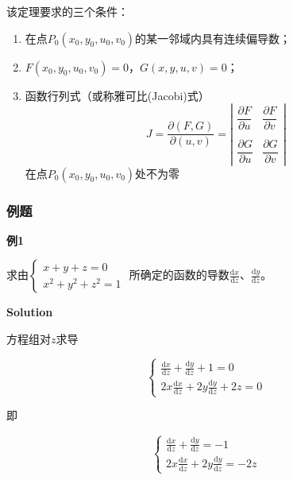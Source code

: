 \documentclass[12pt, a4paper]{article}
\numberwithin{equation}{section}
\newcommand{\rmd}{\mathrm{d}}
\newcommand{\deriv}[2]{\frac{\rmd #1}{\rmd #2}}
\begin{document}
    该定理要求的三个条件：

    \begin{enumerate}
        \item 在点\(P_0\left(x_0,y_0,u_0,v_0\right)\)的某一邻域内具有连续偏导数；
        \item \(F\left(x_0,y_0,u_0,v_0\right)=0\)，\(G\left(x,y,u,v\right)=0\)；
        \item 函数行列式（或称雅可比(Jacobi)式）
            $$
                J=\frac{\partial(F, G)}{\partial(u, v)}=\left|\begin{array}{ll}
                \dfrac{\partial F}{\partial u} & \dfrac{\partial F}{\partial v} \\ \\
                \dfrac{\partial G}{\partial u} & \dfrac{\partial G}{\partial v}
                \end{array}\right|
            $$
            在点\(P_0\left(x_0,y_0,u_0,v_0\right)\)处不为零
    \end{enumerate}

\subsubsection{例题}

    \textbf{例1}
    \vspace{1em}

    求由$\left\{\begin{array}{l}x+y+z=0 \\ x^2+y^2+z^2=1\end{array}\right.$
    所确定的函数的导数\(\deriv{x}{z}\)、\(\deriv{y}{z}\)。
    \vspace{1em}

    \textbf{Solution}
    \vspace{1em}

    方程组对\(z\)求导

    $$
        \left\{\begin{array}{c}
            \deriv{x}{z}+\deriv{y}{z}+1=0 \\
            2 x \deriv{x}{z}+2 y \deriv{y}{z}+2 z=0
        \end{array}\right.
    $$

    即

    $$
        \left\{\begin{array}{c}
            \deriv{x}{z}+\deriv{y}{z}=-1 \\
            2 x \deriv{x}{z}+2 y \deriv{y}{z}=-2 z
        \end{array}\right.
    $$
\end{document}
